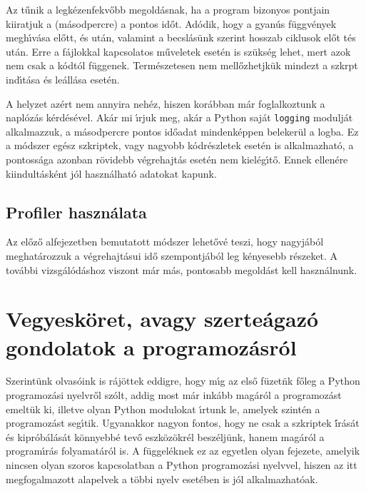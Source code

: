Az t\H{u}nik a legk\'ezenfekv\H{o}bb megold\'asnak, ha a program bizonyos pontjain kiiratjuk a 
(m\'asodpercre) a pontos id\H{o}t. Ad\'odik, hogy a gyan\'us f\"uggv\'enyek megh\'{\i}v\'asa 
el\H{o}tt, \'es ut\'an, valamint a becsl\'as\"unk szerint hosszab ciklusok el\H{o}t t\'es ut\'an. 
Erre a f\'ajlokkal kapcsolatos m\H{u}veletek eset\'en is sz\"uks\'eg lehet, mert azok nem csak 
a k\'odt\'ol f\"uggenek. Term\'eszetesen nem mell\H{o}zhetjk\"uk mindezt a szkrpt ind\'{\i}t\'asa 
\'es le\'all\'asa eset\'en. 

A helyzet az\'ert nem annyira neh\'ez, hiszen kor\'abban m\'ar foglalkoztunk a napl\'oz\'as 
k\'erd\'es\'evel. Ak\'ar mi \'{\i}rjuk meg, ak\'ar a Python saj\'at {\tt logging} modulj\'at 
alkalmazzuk, a m\'asodpercre pontos id\H{o}adat mindenk\'eppen beleker\"ul a logba. Ez a 
m\'odszer eg\'esz szkriptek, vagy nagyobb k\'odr\'eszletek eset\'en is alkalmazhat\'o, a 
pontoss\'aga azonban r\"ovidebb v\'egrehajt\'as eset\'en nem kiel\'eg\'{\i}t\H{o}. Ennek 
ellen\'ere kiindult\'ask\'ent j\'ol haszn\'alhat\'o adatokat kapunk.

\subsection{Profiler haszn\'alata}

Az el\H{o}z\H{o} alfejezetben bemutatott m\'odszer lehet\H{o}v\'e teszi, hogy nagyj\'ab\'ol 
meghat\'arozzuk a v\'egrehajt\'asui id\H{o} szempontj\'ab\'ol leg k\'enyesebb r\'eszeket. A 
tov\'abbi vizsg\'al\'od\'ashoz viszont m\'ar m\'as, pontosabb megold\'ast kell haszn\'alnunk. 

\section{Vegyesk\"oret, avagy szerte\'agaz\'o gondolatok a programoz\'asr\'ol}

Szerint\"unk olvas\'oink is r\'aj\"ottek eddigre, hogy m\'{\i}g az els\H{o} f\"uzet\"nk f\H{o}leg a 
Python programoz\'asi nyelvr\H{o}l sz\'olt, addig most m\'ar ink\'abb mag\'ar\'ol a programoz\'ast 
emelt\"uk ki, illetve olyan Python modulokat \'{\i}rtunk le, amelyek szint\'en a programoz\'ast 
seg\'{\i}tik. Ugyanakkor nagyon fontos, hogy ne csak a szkriptek \'{\'i}r\'as\'at \'es kipr\'ob\'al\'as\'at 
k\"onnyebb\'e tev\H{o} eszk\"oz\"okr\'el besz\'elj\"unk, hanem mag\'ar\'ol a program\'{\i}r\'as 
folyamat\'ar\'ol is. A f\"uggel\'eknek ez az egyetlen olyan fejezete, amelyik nincsen olyan szoros 
kapcsolatban a Python programoz\'asi nyelvvel, hiszen az itt megfogalmazott alapelvek a t\"obbi nyelv 
eset\'eben is j\'ol alkalmazhat\'oak. 

